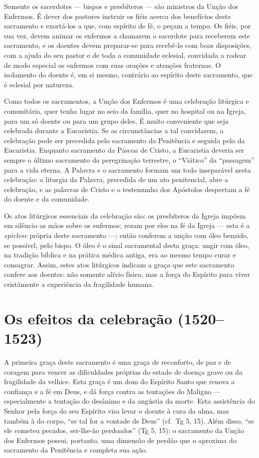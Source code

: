 Somente os sacerdotes --- bispos e presbíteros --- são ministros da Unção dos Enfermos. É dever dos pastores instruir os fiéis acerca dos benefícios deste sacramento e exortá-los a que, com espírito de fé, o peçam a tempo. Os fiéis, por sua vez, devem animar os enfermos a chamarem o sacerdote para receberem este sacramento, e os doentes devem preparar-se para recebê-lo com boas disposições, com a ajuda do seu pastor e de toda a comunidade eclesial, convidada a rodear de modo especial os enfermos com suas orações e atenções fraternas. O isolamento do doente é, em si mesmo, contrário ao espírito deste sacramento, que é eclesial por natureza.

Como todos os sacramentos, a Unção dos Enfermos é uma celebração litúrgica e comunitária, quer tenha lugar no seio da família, quer no hospital ou na Igreja, para um só doente ou para um grupo deles. É muito conveniente que seja celebrada durante a Eucaristia. Se as circunstâncias a tal convidarem, a celebração pode ser precedida pelo sacramento da Penitência e seguida pelo da Eucaristia. Enquanto sacramento da Páscoa de Cristo, a Eucaristia deveria ser sempre o último sacramento da peregrinação terrestre, o ``Viático'' da ``passagem'' para a vida eterna. A Palavra e o sacramento formam um todo inseparável nesta celebração: a liturgia da Palavra, precedida de um ato penitencial, abre a celebração, e as palavras de Cristo e o testemunho dos Apóstolos despertam a fé do doente e da comunidade.

Os atos litúrgicos essenciais da celebração são: os presbíteros da Igreja impõem em silêncio as mãos sobre os enfermos; rezam por eles na fé da Igreja --- esta é a \emph{epiclese} própria deste sacramento ---; então conferem a unção com óleo benzido, se possível, pelo bispo. O óleo é o sinal sacramental desta graça: ungir com óleo, na tradição bíblica e na prática médica antiga, era ao mesmo tempo curar e consagrar. Assim, estes atos litúrgicos indicam a graça que este sacramento confere aos doentes: não somente alívio físico, mas a força do Espírito para viver cristãmente a experiência da fragilidade humana.

\section{Os efeitos da celebração (1520--1523)}

A primeira graça deste sacramento é uma graça de reconforto, de paz e de coragem para vencer as dificuldades próprias do estado de doença grave ou da fragilidade da velhice. Esta graça é um dom do Espírito Santo que renova a confiança e a fé em Deus, e dá força contra as tentações do Maligno --- especialmente a tentação do desânimo e da angústia da morte. Esta assistência do Senhor pela força do seu Espírito visa levar o doente à cura da alma, mas também à do corpo, ``se tal for a vontade de Deus'' (cf.~Tg 5, 15). Além disso, ``se ele cometeu pecados, ser-lhe-ão perdoados'' (Tg 5, 15): o sacramento da Unção dos Enfermos possui, portanto, uma dimensão de perdão que o aproxima do sacramento da Penitência e completa sua ação.

